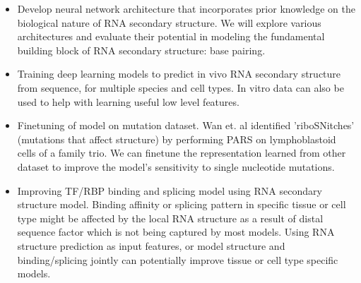 \documentclass{proposal}
\begin{document}
\begin{itemize}
    \item Develop neural network architecture that incorporates prior knowledge on the biological nature of RNA secondary structure.
    We will explore various architectures and evaluate their potential in modeling the
    fundamental building block of RNA secondary structure: base pairing.


    \item Training deep learning models to predict in vivo RNA secondary structure from sequence, for multiple species and cell types.
        In vitro data can also be used to help with learning useful low level features.


    \item Finetuning of model on mutation dataset.
        Wan et. al\cite{wan2014landscape} identified '﻿riboSNitches' (mutations that affect structure)
        by performing PARS on ﻿lymphoblastoid cells of a family trio.
        We can finetune the representation learned from other dataset to improve the model's sensitivity to single nucleotide mutations.


%

    \item Improving TF/RBP binding and splicing model using RNA secondary structure model.
        Binding affinity or splicing pattern in specific tissue or cell type might be affected
        by the local RNA structure as a result of distal sequence factor which is not being captured by most models.
        Using RNA structure prediction as input features, or model structure and binding/splicing jointly can potentially improve tissue or cell type specific models.
\end{itemize}
\end{document}
